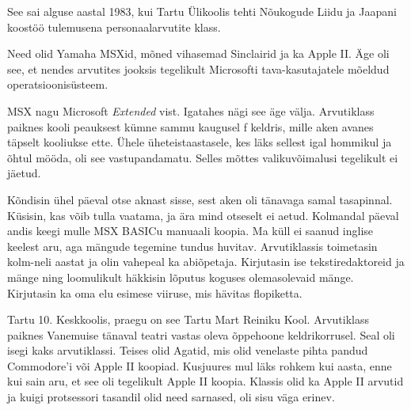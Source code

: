 
See sai alguse aastal 1983, kui Tartu 
Ülikoolis tehti Nõukogude Liidu ja Jaapani koostöö 
tulemusena personaalarvutite klass.


Need olid Yamaha MSXid, mõned vihasemad Sinclairid ja 
ka Apple II. Äge oli see, et nendes arvutites jooksis 
tegelikult Microsofti tava-kasutajatele mõeldud operatsioonisüsteem.


MSX nagu Microsoft \emph{Extended} vist. Igatahes nägi see äge välja. Arvutiklass paiknes kooli peauksest kümne sammu kaugusel f
keldris, mille aken avanes täpselt kooliukse ette. Ühele üheteistaastasele, kes läks sellest igal hommikul ja õhtul mööda, 
oli see vastupandamatu. Selles mõttes valikuvõimalusi tegelikult 
ei jäetud. 


Kõndisin ühel päeval otse aknast sisse, sest 
aken oli tänavaga samal tasapinnal. Küsisin, kas võib tulla vaatama, ja ära mind otseselt ei aetud. Kolmandal päeval 
andis keegi mulle MSX BASICu 
manuaali koopia. Ma küll ei saanud 
inglise keelest aru, aga mängude tegemine tundus huvitav. 
Arvutiklassis toimetasin kolm-neli aastat ja olin vahepeal ka abiõpetaja. Kirjutasin ise tekstiredaktoreid ja mänge ning loomulikult häkkisin 
lõputus koguses olemasolevaid mänge. Kirjutasin ka oma elu esimese viiruse, mis hävitas flopiketta. 


Tartu 10. Keskkoolis, praegu on see
Tartu Mart Reiniku Kool.
 Arvutiklass paiknes Vanemuise tänaval teatri vastas 
oleva õppehoone keldrikorrusel. 
Seal oli isegi kaks arvutiklassi. Teises olid 
Agatid, mis olid venelaste pihta pandud 
Commodore'i või Apple II koopiad. Kusjuures mul läks rohkem kui aasta, enne kui sain aru, et see oli tegelikult 
Apple II koopia. Klassis olid ka Apple 
II arvutid ja kuigi protsessori tasandil olid need sarnased, 
oli sisu väga erinev. 

